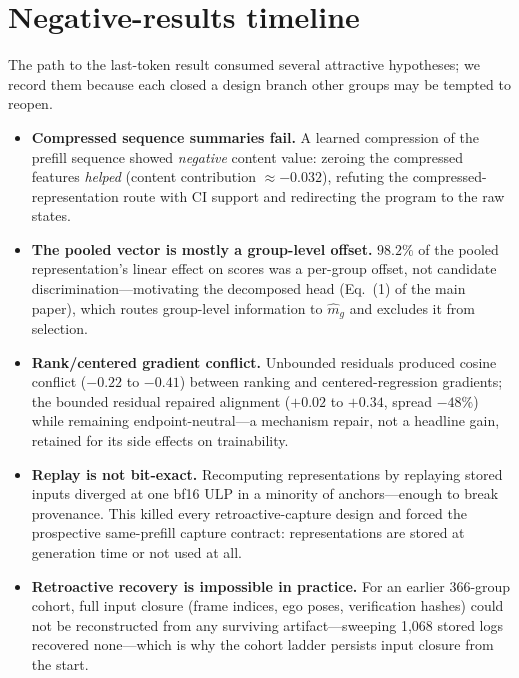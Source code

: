 \documentclass[10pt,twocolumn,letterpaper]{article}
\begin{document}
\section{Negative-results timeline}
\label{supp:negatives}

The path to the last-token result consumed several attractive hypotheses; we record them because each closed a design branch other groups may be tempted to reopen.

\begin{itemize}
  \item \textbf{Compressed sequence summaries fail.} A learned compression of the prefill sequence showed \emph{negative} content value: zeroing the compressed features \emph{helped} (content contribution $\approx-0.032$), refuting the compressed-representation route with CI support and redirecting the program to the raw states.
  \item \textbf{The pooled vector is mostly a group-level offset.} $98.2\%$ of the pooled representation's linear effect on scores was a per-group offset, not candidate discrimination---motivating the decomposed head (Eq.~(1) of the main paper), which routes group-level information to $\hat m_g$ and excludes it from selection.
  \item \textbf{Rank/centered gradient conflict.} Unbounded residuals produced cosine conflict ($-0.22$ to $-0.41$) between ranking and centered-regression gradients; the bounded residual repaired alignment ($+0.02$ to $+0.34$, spread $-48\%$) while remaining endpoint-neutral---a mechanism repair, not a headline gain, retained for its side effects on trainability.
  \item \textbf{Replay is not bit-exact.} Recomputing representations by replaying stored inputs diverged at one bf16 ULP in a minority of anchors---enough to break provenance. This killed every retroactive-capture design and forced the prospective same-prefill capture contract: representations are stored at generation time or not used at all.
  \item \textbf{Retroactive recovery is impossible in practice.} For an earlier 366-group cohort, full input closure (frame indices, ego poses, verification hashes) could not be reconstructed from any surviving artifact---sweeping 1{,}068 stored logs recovered none---which is why the cohort ladder persists input closure from the start.
\end{itemize}
\end{document}
